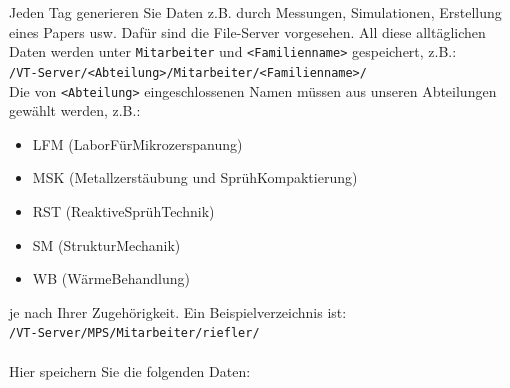Jeden Tag generieren Sie Daten z.B. durch Messungen, Simulationen, Erstellung
eines Papers usw. Dafür sind die File-Server vorgesehen. All diese alltäglichen
Daten werden unter \texttt{Mitarbeiter} und \texttt{<Familienname>} gespeichert,
z.B.: \\
\texttt{/VT-Server/<Abteilung>/Mitarbeiter/<Familienname>/} \\
Die von \texttt{<Abteilung>} eingeschlossenen Namen müssen aus unseren
Abteilungen gewählt werden, z.B.:
\begin{itemize}
  \item LFM (LaborFürMikrozerspanung)
  \item MSK (Metallzerstäubung und SprühKompaktierung)
  \item RST (ReaktiveSprühTechnik)
  \item SM (StrukturMechanik)
  \item WB (WärmeBehandlung)
\end{itemize}
je nach Ihrer Zugehörigkeit. Ein Beispielverzeichnis ist: \\
\texttt{/VT-Server/MPS/Mitarbeiter/riefler/} \\
\\
Hier speichern Sie die folgenden Daten:
